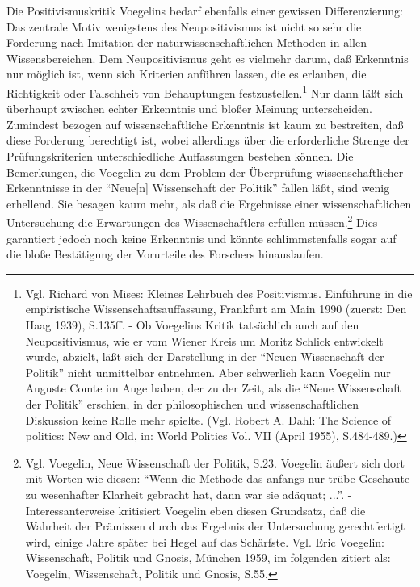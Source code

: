 Die Positivismuskritik Voegelins bedarf ebenfalls einer gewissen
Differenzierung: Das zentrale Motiv wenigstens des Neupositivismus ist
nicht so sehr die Forderung nach Imitation der naturwissenschaftlichen
Methoden in allen Wissensbereichen. Dem Neupositivismus geht es
vielmehr darum, daß Erkenntnis nur möglich ist, wenn sich Kriterien
anführen lassen, die es erlauben, die Richtigkeit oder Falschheit von
Behauptungen festzustellen.\footnote{Vgl. Richard von Mises: Kleines
  Lehrbuch des Positivismus. Einführung in die empiristische
  Wissenschaftsauf\/fassung, Frankfurt am Main 1990 (zuerst: Den Haag
  1939), S.135ff. - Ob Voegelins Kritik tatsächlich auch auf den
  Neupositivismus, wie er vom Wiener Kreis um Moritz Schlick
  entwickelt wurde, abzielt, läßt sich der Darstellung in der "`Neuen
  Wissenschaft der Politik"' nicht unmittelbar entnehmen. Aber
  schwerlich kann Voegelin nur Auguste Comte im Auge haben, der zu der
  Zeit, als die "`Neue Wissenschaft der Politik"' erschien, in der
  philosophischen und wissenschaftlichen Diskussion keine
  Rolle mehr spielte. (Vgl. Robert A. Dahl: The Science of politics: New
  and Old, in: World Politics Vol. VII (April 1955), S.484-489.)} Nur
dann läßt sich überhaupt zwischen echter Erkenntnis und bloßer Meinung
unterscheiden.  Zumindest bezogen auf wissenschaftliche Erkenntnis ist
kaum zu bestreiten, daß diese Forderung berechtigt ist, wobei
allerdings über die erforderliche Strenge der Prüfungskriterien
unterschiedliche Auf\/fassungen bestehen können.  Die Bemerkungen, die
Voegelin zu dem Problem der Überprüfung wissenschaftlicher
Erkenntnisse in der "`Neue[n] Wissenschaft der Politik"' fallen läßt,
sind wenig erhellend. Sie besagen kaum mehr, als daß die Ergebnisse
einer wissenschaftlichen Untersuchung die Erwartungen des
Wissenschaftlers erfüllen müssen.\footnote{Vgl. Voegelin, Neue
  Wissenschaft der Politik, S.23. Voegelin äußert sich dort mit Worten
  wie diesen: "`Wenn die Methode das anfangs nur trübe Geschaute zu
  wesenhafter Klarheit gebracht hat, dann war sie adäquat; ..."'. -
  Interessanterweise kritisiert Voegelin eben diesen Grundsatz, daß
  die Wahrheit der Prämissen durch das Ergebnis der Untersuchung
  gerechtfertigt wird, einige Jahre später bei Hegel auf das
  Schärfste. Vgl. Eric Voegelin: Wissenschaft, Politik und Gnosis,
  München 1959, im folgenden zitiert als: Voegelin, Wissenschaft,
  Politik und Gnosis, S.55.} Dies garantiert jedoch noch keine
Erkenntnis und könnte schlimmstenfalls sogar auf die bloße Bestätigung
der Vorurteile des Forschers hinauslaufen.

